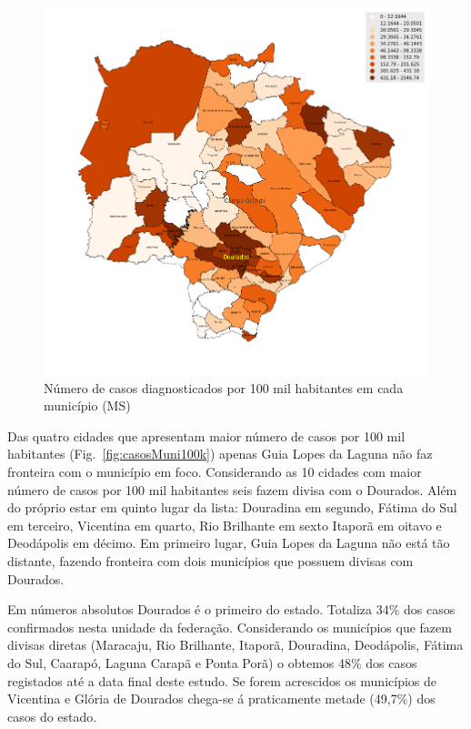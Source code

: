 \documentclass[12pt]{article}
\begin{document}
\begin{figure}[!htb]
    \centering
    \includegraphics[width=1\textwidth]{figs/mapa_casos_100_mil.png}
    \caption{Número de casos diagnosticados por 100 mil habitantes em cada município (MS)}
    \label{fig:mapa100K}
    \end{figure}
  
Das quatro cidades que apresentam maior número de casos por 100 mil habitantes (Fig.~\ref{fig:casosMuni100k}) apenas Guia Lopes da Laguna não faz fronteira com o município em foco. Considerando as 10 cidades com maior número de casos por 100 mil habitantes seis fazem divisa com o Dourados. Além do próprio estar em quinto lugar da lista: Douradina em segundo, Fátima do Sul em terceiro, Vicentina em quarto, Rio Brilhante em sexto Itaporã em oitavo e Deodápolis em décimo. Em primeiro lugar, Guia Lopes da Laguna não está tão distante, fazendo fronteira com dois municípios que possuem divisas com Dourados. 

Em números absolutos Dourados é o primeiro do estado. Totaliza 34\% dos casos confirmados nesta unidade da federação. Considerando os municípios que fazem divisas diretas (Maracaju, Rio Brilhante, Itaporã, Douradina, Deodápolis, Fátima do Sul, Caarapó, Laguna Carapã e Ponta Porã) o obtemos 48\% dos casos registados até a data final deste estudo. Se forem acrescidos os municípios de Vicentina e Glória de Dourados chega-se á praticamente metade (49,7\%) dos casos do estado.
\end{document}
